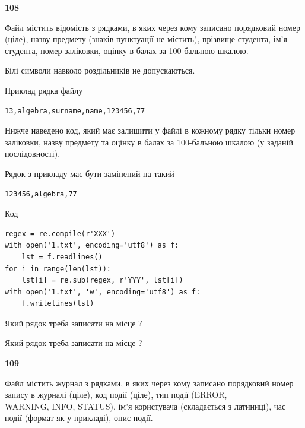 \newpage

{\begin {center}\textbf{ 108}\end {center}}\par
Файл  містить відомість з рядками, в яких через кому записа\-но поряд\-ковий номер (ціле), назву предмету (знаків пунктуації не містить), прізвище студента, ім'я студента, номер заліковки, оцінку в балах за 100 бальною шкалою.

Білі символи навколо роздільників не допускаються.

Приклад рядка файлу



\begin{verbatim}
13,algebra,surname,name,123456,77
\end{verbatim}


Нижче наведено код, який має залишити у файлі в кожному рядку тільки номер заліковки, назву предмету та оцінку в балах за 100-бальною шкалою (у заданій послі\-дов\-ності).

Рядок з прикладу має бути замінений на такий



\begin{verbatim}
123456,algebra,77
\end{verbatim}




Код



\begin{verbatim}
regex = re.compile(r'XXX')
with open('1.txt', encoding='utf8') as f:
    lst = f.readlines()
for i in range(len(lst)):
    lst[i] = re.sub(regex, r'YYY', lst[i])
with open('1.txt', 'w', encoding='utf8') as f:
    f.writelines(lst)
\end{verbatim}







Який рядок треба записати на місце  ?\par
\vspace{5mm}


Який рядок треба записати на місце  ?\par


\newpage

{\begin {center}\textbf{ 109}\end {center}}\par
Файл  містить журнал з рядками, в яких через кому записано поряд\-ко\-вий номер запису в журналі (ціле), код події (ціле), тип події (ERROR, \\WARNING, INFO, STATUS), ім'я користувача (складається з латиниці), час події (фор\-мат як у прикладі), опис події.


